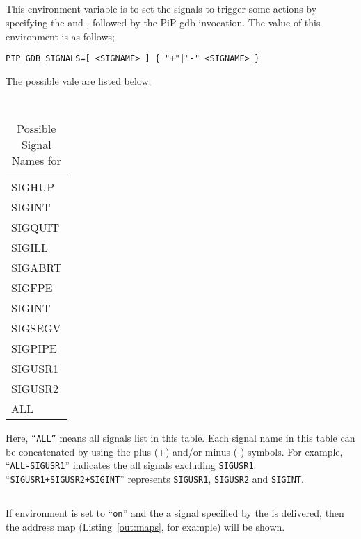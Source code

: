 \subsection{}

This environment variable  is to set the
signals to trigger some actions by specifying the
 and , followed by
the PiP-gdb invocation. The value of this environment is as follows;

\begin{lstlisting}[frame=tb]
  PIP_GDB_SIGNALS=[ <SIGNAME> ] { "+"|"-" <SIGNAME> }
\end{lstlisting}

The possible {\tt{}} vale are listed below;

\begin{table}[ht]
  \centering
  \caption{Possible Signal Names for }
  \vspace{3mm}
  \tt
  \begin{tabular}{l}
    SIGHUP \\
    SIGINT \\
    SIGQUIT \\
    SIGILL \\
    SIGABRT \\
    SIGFPE \\
    SIGINT \\
    SIGSEGV \\
    SIGPIPE \\
    SIGUSR1 \\
    SIGUSR2 \\
    ALL \\
  \end{tabular}
\end{table}

Here, {\tt ``ALL''} means all signals list in this table. Each signal
name in this table can be concatenated by using the plus (+) and/or
minus (-) symbols.  For example, ``{\tt ALL-SIGUSR1}'' indicates the
all signals excluding {\tt SIGUSR1}. ``{\tt SIGUSR1+SIGUSR2+SIGINT}''
represents {\tt SIGUSR1}, {\tt SIGUSR2} and {\tt SIGINT}. 

\subsection{}

If  environment is set to ``{\tt on}'' and the
a signal specified by the  is delivered, then
the address map (Listing~\ref{out:maps}, for example) will be shown. 

